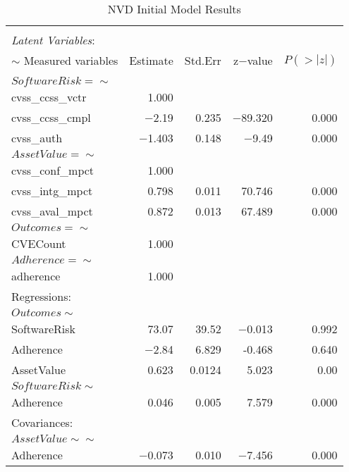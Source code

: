 \begin{table}
	\begin{center}	
		\caption{NVD Initial Model Results}
		\label{tab:results_nvd}
		\begin{tabular}{l|rrrr}
				\\[-1.8ex]\hline 
				\hline \\[-1.8ex] 
			\textit{Latent Variables}:  & & & & \\  
			$\sim$ Measured variables& Estimate & Std.Err & z$-$value & $P(>|z|)$ \\
				\hline \\[-1.8ex]
			$SoftwareRisk =\sim$  & & & & \\                                   
			cvss\_ccss\_vctr   & 1.000 & &  & \\                             
			cvss\_ccss\_cmpl &  $-$2.19 &   0.235 &  $-$89.320 &   0.000\\
			cvss\_auth     &   $-$1.403  &  0.148  & $-$9.49   & 0.000\\
			$AssetValue =\sim$     & & & & \\                                    
			cvss\_conf\_mpct   & 1.000     & & & \\                       
			cvss\_intg\_mpct   & 0.798   & 0.011 & 70.746 &   0.000 \\
			cvss\_aval\_mpct  &  0.872   & 0.013 & 67.489   & 0.000 \\
			$Outcomes =\sim$    & & & & \\                                     
			CVECount     &  1.000  & & & \\                          
			$Adherence =\sim$   & & & & \\                                      
			adherence    &     1.000        & & & \\                    
			Regressions:  & & & & \\  
			$Outcomes \sim$         & & & & \\                                     
			SoftwareRisk   &  73.07 &   39.52 & $-$0.013 &   0.992 \\
			Adherence       &  $-$2.84  &  6.829  &  -0.468  &  0.640\\
			AssetValue     &   0.623  &  0.0124  &  5.023 &   0.00\\
			$SoftwareRisk \sim$        & & & & \\                                  
			Adherence     &    0.046 &   0.005  &  7.579 &   0.000\\
			Covariances:  & & & & \\  
			$AssetValue \sim\sim$          & & & & \\                                 
			Adherence      &  $-$0.073  &  0.010 &  $-$7.456 &   0.000\\
		\end{tabular}
	\end{center}
\end{table}

